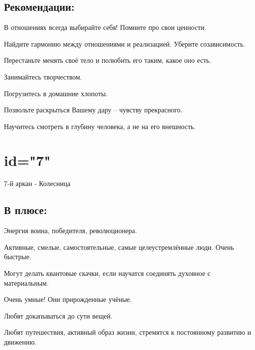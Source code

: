 \subsection{Рекомендации:}
\item В отношениях всегда выбирайте себя! Помните про свои ценности.
\item Найдите гармонию между отношениями и реализацией. Уберите созависимость.
\item Перестаньте менять своё тело и полюбить его таким, какое оно есть.
\item Занимайтесь творчеством.
\item Погрузитесь в домашние хлопоты.
\item Позвольте раскрыться Вашему дару – чувству прекрасного.
\item Научитесь смотреть в глубину человека, а не на его внешность.
\endsubsection

\endsection

\section{id="7"}{7-й аркан - Колесница}

\subsection{В плюсе:}
\item Энергия воина, победителя, революционера.
\item Активные, смелые, самостоятельные, самые целеустремлённые люди. Очень быстрые.
\item Могут делать квантовые скачки, если научатся соединять духовное с материальным.
\item Очень умные! Они прирожденные учёные.
\item Любят докапываться до сути вещей.
\item Любят путешествия, активный образ жизни, стремятся к постоянному развитию и движению.
\endsubsection

